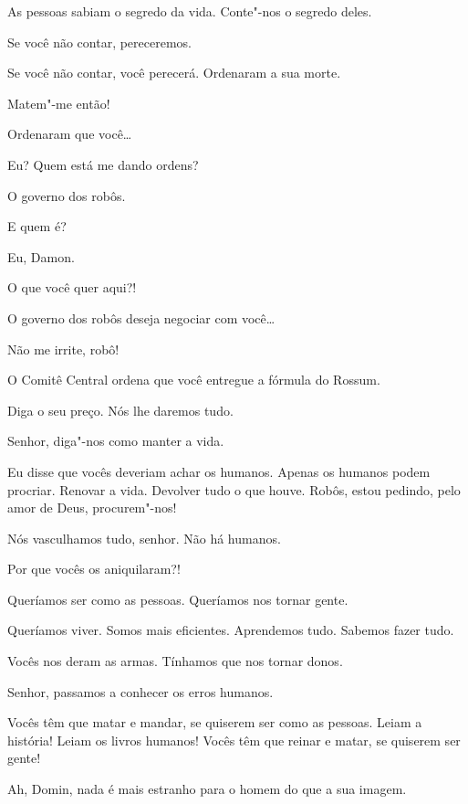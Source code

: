  As pessoas sabiam o segredo da vida. Conte"-nos o segredo deles.

 Se você não contar, pereceremos.

 Se você não contar, você perecerá. Ordenaram a sua morte.

  Matem"-me então!

 Ordenaram que você\ldots{}

 Eu? Quem está me dando ordens?

 O governo dos robôs.

 E quem é?

 Eu, Damon.

 O que você quer aqui?! 

 O governo dos robôs deseja negociar com você\ldots{}

 Não me irrite, robô! 

 O Comitê Central ordena que você entregue a fórmula do Rossum.

 

 Diga o seu preço. Nós lhe daremos tudo.

 Senhor, diga"-nos como manter a vida.

 Eu disse que vocês deveriam achar os humanos. Apenas os
humanos podem procriar. Renovar a vida. Devolver tudo o que houve. Robôs, estou
pedindo, pelo amor de Deus, procurem"-nos!

 Nós vasculhamos tudo, senhor. Não há humanos.

 Por que vocês os aniquilaram?!

 Queríamos ser como as pessoas. Queríamos nos tornar gente.

 Queríamos viver. Somos mais eficientes. Aprendemos tudo. Sabemos fazer
tudo.

 Vocês nos deram as armas. Tínhamos que nos tornar donos.

 Senhor, passamos a conhecer os erros humanos.

 Vocês têm que matar e mandar, se quiserem ser como as pessoas. Leiam a
história! Leiam os livros humanos! Vocês têm que reinar e matar, se quiserem ser
gente!

 Ah, Domin, nada é mais estranho para o homem do que a sua imagem.

